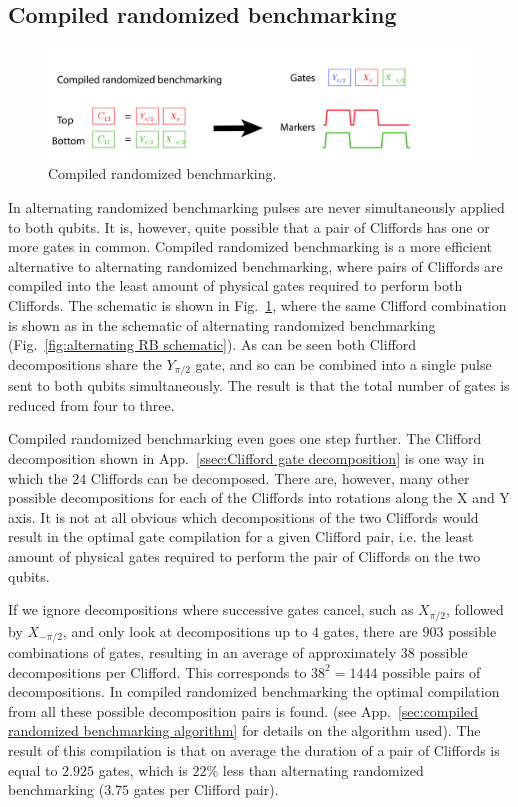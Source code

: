       \subsection{Compiled randomized benchmarking}
        \label{ssec:compiled randomized benchmarking}

        \begin{figure}[!h]
          \centering
          \includegraphics[width=\textwidth]{Figures/Randomized benchmarking/compiled RB.jpg}
          \caption{Compiled randomized benchmarking.}
          \label{fig:compiled RB schematic}
        \end{figure}

        In alternating randomized benchmarking pulses are never simultaneously applied to both qubits. It is, however, quite possible that a pair of Cliffords has one or more gates in common. Compiled randomized benchmarking is a more efficient alternative to alternating randomized benchmarking, where pairs of Cliffords are compiled into the least amount of physical gates required to perform both Cliffords. The schematic is shown in Fig.~\ref{fig:compiled RB schematic}, where the same Clifford combination is shown as in the schematic of alternating randomized benchmarking (Fig.~\ref{fig:alternating RB schematic}). As can be seen both Clifford decompositions share the $Y_{\pi/2}$ gate, and so can be combined into a single pulse sent to both qubits simultaneously. The result is that the total number of gates is reduced from four to three.

        Compiled randomized benchmarking even goes one step further. The Clifford decomposition shown in App.~\ref{ssec:Clifford gate decomposition} is one way in which the $24$ Cliffords can be decomposed. There are, however, many other possible decompositions for each of the Cliffords into rotations along the X and Y axis. It is not at all obvious which decompositions of the two Cliffords would result in the optimal gate compilation for a given Clifford pair, i.e. the least amount of physical gates required to perform the pair of Cliffords on the two qubits.

        If we ignore decompositions where successive gates cancel, such as $X_{\pi/2}$, followed by $X_{-\pi/2}$, and only look at decompositions up to $4$ gates, there are $903$ possible combinations of gates, resulting in an average of approximately $38$ possible decompositions per Clifford. This corresponds to $38^2=1444$ possible pairs of decompositions. In compiled randomized benchmarking the optimal compilation from all these possible decomposition pairs is found. (see App.~\ref{sec:compiled randomized benchmarking algorithm} for details on the algorithm used). The result of this compilation is that on average the duration of a pair of Cliffords is equal to $2.925$ gates, which is $22\%$ less than alternating randomized benchmarking ($3.75$ gates per Clifford pair).

